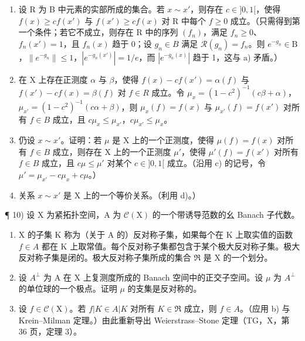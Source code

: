 \begin{enumerate}
\def\labelenumi{\alph{enumi})}
\setcounter{enumi}{1}
\item
  设 R 为 B 中元素的实部所成的集合。若 \(x \sim x'\)，则存在 \(c \in ]0,1[\)，使得 \(f(x) \geqslant cf(x')\) 与 \(f(x') \geqslant cf(x)\) 对 R 中每个 \(f \geqslant 0\) 成立。（只需得到第一个条件；若它不成立，则存在 R 中的序列 \((f_n)\)，满足 \(f_n \geqslant 0\)、\(f_n(x') = 1\)，且 \(f_n(x)\) 趋于 0；设 \(g_n \in B\) 满足 \(\mathcal{R}(g_n) = f_n\)。则 \(e^{-g_n} \in \mathrm{B}\)，\(\| e^{-g_n} \| \leqslant 1\)，\(|e^{-g_n(x')}| = 1 / e\)，而 \(|e^{-g_n(x)}|\) 趋于 1，这与 a) 矛盾。）
\item
  在 X 上存在正测度 \(\alpha\) 与 \(\beta\)，使得 \(f(x)-cf(x')=\alpha(f)\) 与 \(f(x')-cf(x)=\beta(f)\) 对 \(f\in R\) 成立。令 \(\mu_{x}=(1-c^{2})^{-1}(c\beta+\alpha)\)，\(\mu_{x'}=(1-c^{2})^{-1}(c\alpha+\beta)\)，则 \(\mu_{x}(f)=f(x)\) 与 \(\mu_{x'}(f)=f(x')\) 对所有 \(f\in B\) 成立，且 \(c\mu_{x}\leqslant\mu_{x'}\)，\(c\mu_{x'}\leqslant\mu_{x}\)。
\item
  仍设 \(x \sim x'\)。证明：若 \(\mu\) 是 X 上的一个正测度，使得 \(\mu(f) = f(x)\) 对所有 \(f \in B\) 成立，则存在 X 上的一个正测度 \(\mu'\)，使得 \(\mu'(f) = f(x')\) 对所有 \(f \in B\) 成立，且 \(c\mu \leqslant \mu'\) 对某个 \(c \in]0,1[\) 成立。（沿用 c) 的记号，令 \(\mu' = \mu_{x'} - c\mu_x + c\mu\)。）
\item
  关系 \(x \sim x'\) 是 X 上的一个等价关系。（利用 d)。）
\end{enumerate}

¶ 10) 设 X 为紧拓扑空间，A 为 \(\mathcal{C}(\mathrm{X})\) 的一个带诱导范数的幺 Banach 子代数。

\begin{enumerate}
\def\labelenumi{\alph{enumi})}
\item
  X 的子集 K 称为（关于 A 的）反对称子集，如果每个在 K 上取实值的函数 \(f \in A\) 都在 K 上取常值。每个反对称子集都包含于某个极大反对称子集。极大反对称子集是闭的。极大反对称子集所成的集合 \(\mathfrak{R}\) 是 X 的一个划分。
\item
  设 \(A^{\perp}\) 为 A 在 X 上复测度所成的 Banach 空间中的正交子空间。设 \(\mu\) 为 \(A^{\perp}\) 的单位球的一个极点。证明 \(\mu\) 的支集是反对称的。
\item
  设 \(f \in \mathcal{C}(\mathrm{X})\)。若 \(f|K \in A|K\) 对所有 \(K \in \mathfrak{R}\) 成立，则 \(f \in A\)。（应用 b) 与 Krein–Milman 定理。）由此重新导出 Weierstrass–Stone 定理（TG，X，第 36 页，定理 3）。
\end{enumerate}

